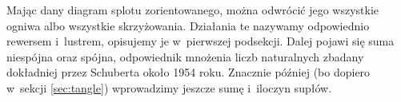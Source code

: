 
Mając dany diagram splotu zorientowanego, można odwrócić jego wszystkie ogniwa albo wszystkie skrzyżowania.
Działania te nazywamy odpowiednio rewersem i~lustrem, opisujemy je w~pierwszej podsekcji.
Dalej pojawi się suma niespójna oraz spójna, odpowiednik mnożenia liczb naturalnych zbadany dokładniej przez Schuberta około 1954 roku.
%
Znacznie później (bo dopiero w~sekcji \ref{sec:tangle}) wprowadzimy jeszcze sumę i~iloczyn supłów.







